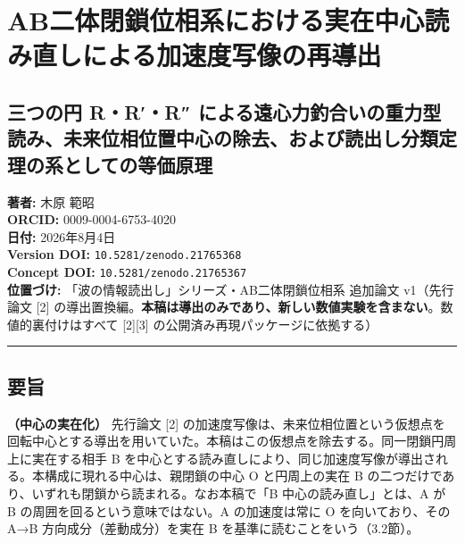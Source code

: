\documentclass[
  a4paper,
]{ltjsarticle}
\author{}
\date{}
\begin{document}
\section{AB二体閉鎖位相系における実在中心読み直しによる加速度写像の再導出}\label{abux4e8cux4f53ux9589ux9396ux4f4dux76f8ux7cfbux306bux304aux3051ux308bux5b9fux5728ux4e2dux5fc3ux8aadux307fux76f4ux3057ux306bux3088ux308bux52a0ux901fux5ea6ux5199ux50cfux306eux518dux5c0eux51fa}

\subsection{三つの円 R・R′・R″
による遠心力釣合いの重力型読み、未来位相位置中心の除去、および読出し分類定理の系としての等価原理}\label{ux4e09ux3064ux306eux5186-rrr-ux306bux3088ux308bux9060ux5fc3ux529bux91e3ux5408ux3044ux306eux91cdux529bux578bux8aadux307fux672aux6765ux4f4dux76f8ux4f4dux7f6eux4e2dux5fc3ux306eux9664ux53bbux304aux3088ux3073ux8aadux51faux3057ux5206ux985eux5b9aux7406ux306eux7cfbux3068ux3057ux3066ux306eux7b49ux4fa1ux539fux7406}

\textbf{著者:} 木原 範昭\\
\textbf{ORCID:} 0009-0004-6753-4020\\
\textbf{日付:} 2026年8月4日\\
\textbf{Version DOI:} \texttt{10.5281/zenodo.21765368}\\
\textbf{Concept DOI:} \texttt{10.5281/zenodo.21765367}\\
\textbf{位置づけ:} 「波の情報読出し」シリーズ・AB二体閉鎖位相系 追加論文
v1（先行論文 {[}2{]}
の導出置換編。\textbf{本稿は導出のみであり、新しい数値実験を含まない}。数値的裏付けはすべて
{[}2{]}{[}3{]} の公開済み再現パッケージに依拠する）

\begin{center}\rule{0.5\linewidth}{0.5pt}\end{center}

\subsection{要旨}\label{ux8981ux65e8}

\textbf{（中心の実在化）} 先行論文 {[}2{]}
の加速度写像は、未来位相位置という仮想点を回転中心とする導出を用いていた。本稿はこの仮想点を除去する。同一閉鎖円周上に実在する相手
B
を中心とする読み直しにより、同じ加速度写像が導出される。本構成に現れる中心は、親閉鎖の中心
O と円周上の実在 B
の二つだけであり、いずれも閉鎖から読まれる。なお本稿で「B
中心の読み直し」とは、A が B の周囲を回るという意味ではない。A
の加速度は常に O を向いており、その A→B 方向成分（差動成分）を実在 B
を基準に読むことをいう（3.2節）。
\end{document}
